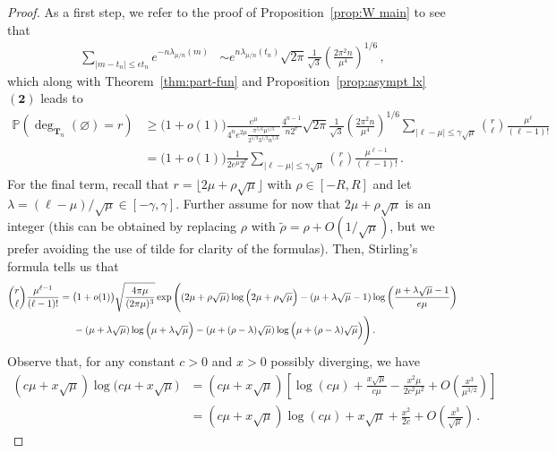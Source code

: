 \documentclass{article}
\newcommand{\pr}{\mathbb{P}}								%
\newcommand{\Prob}[1]{\pr\left(#1\right)}					%
\newcommand{\1}{\mathbbm{1}}								%
\theoremstyle{definition}
\numberwithin{equation}{section}
\newcommand{\numitem}[1]{$\mathbf{(#1)}$}
\begin{document}
\begin{proof}
    As a first step, we refer to the proof of Proposition~\ref{prop:W main} to see that
    \begin{align*}
        \sum_{|m-t_n|\leq\epsilon t_n}e^{-n\lambda_{\mu/n}(m)}
        &\sim e^{n\lambda_{\mu/n}(t_n)}\sqrt{2\pi}\frac{1}{\sqrt{3}}\left(\frac{2\pi^2n}{\mu^4}\right)^{1/6}\,,
    \end{align*}
    which along with Theorem~\ref{thm:part-fun} and Proposition~\ref{prop:asympt lx}~\numitem{2} leads to
    \begin{align*}
        \Prob{\deg_{\mathbf{T}_n}(\varnothing)=r}
        &\geq\big(1+o(1)\big)\frac{e^\mu}{4^ne^{2\mu}\frac{\pi^{5/6}\mu^{1/3}}{2^{1/3}3^{1/2}n^{5/6}}}\frac{4^{n-1}}{n2^r}\sqrt{2\pi}\frac{1}{\sqrt{3}}\left(\frac{2\pi^2n}{\mu^4}\right)^{1/6}\sum_{|\ell-\mu|\leq\gamma\sqrt{\mu}}\binom{r}{\ell}\frac{\mu^\ell}{(\ell-1)!}\\
        &=\big(1+o(1)\big)\frac{1}{2e^\mu2^r}\sum_{|\ell-\mu|\leq\gamma\sqrt{\mu}}\binom{r}{\ell}\frac{\mu^{\ell-1}}{(\ell-1)!}\,.
    \end{align*}
    For the final term, recall that $r=\lfloor2\mu+\rho\sqrt{\mu}\rfloor$ with $\rho\in[-R,R]$ and let $\lambda=(\ell-\mu)/\sqrt{\mu}\in[-\gamma,\gamma]$.
    Further assume for now that $2\mu+\rho\sqrt{\mu}$ is an integer (this can be obtained by replacing $\rho$ with $\tilde{\rho}=\rho+O(1/\sqrt{\mu})$, but we prefer avoiding the use of tilde for clarity of the formulas).
    Then, Stirling's formula tells us that
    \begin{align*}
        \binom{r}{\ell}\frac{\mu^{\ell-1}}{(\ell-1)!}
        &=\big(1+o(1)\big)\sqrt{\frac{4\pi\mu}{(2\pi\mu)^3}}\exp\Bigg((2\mu+\rho\sqrt{\mu})\log\Big(2\mu+\rho\sqrt{\mu}\Big)-(\mu+\lambda\sqrt{\mu}-1)\log\left(\frac{\mu+\lambda\sqrt{\mu}-1}{e\mu}\right)\\
        &\hspace{0.5cm}-(\mu+\lambda\sqrt{\mu})\log\Big(\mu+\lambda\sqrt{\mu}\Big)-(\mu+(\rho-\lambda)\sqrt{\mu})\log\Big(\mu+(\rho-\lambda)\sqrt{\mu}\Big)\Bigg)\,.
    \end{align*}
    Observe that, for any constant $c>0$ and $x>0$ possibly diverging, we have
    \begin{align*}
        (c\mu+x\sqrt{\mu})\log\Big(c\mu+x\sqrt{\mu}\Big)
        &=(c\mu+x\sqrt{\mu})\left[\log(c\mu)+\frac{x\sqrt{\mu}}{c\mu}-\frac{x^2\mu}{2c^2\mu^2}+O\left(\frac{x^3}{\mu^{3/2}}\right)\right]\\
        &=(c\mu+x\sqrt{\mu})\log(c\mu)+x\sqrt{\mu}+\frac{x^2}{2c}+O\left(\frac{x^3}{\sqrt{\mu}}\right)\,.

\end{align*}
\end{proof}
\end{document}
